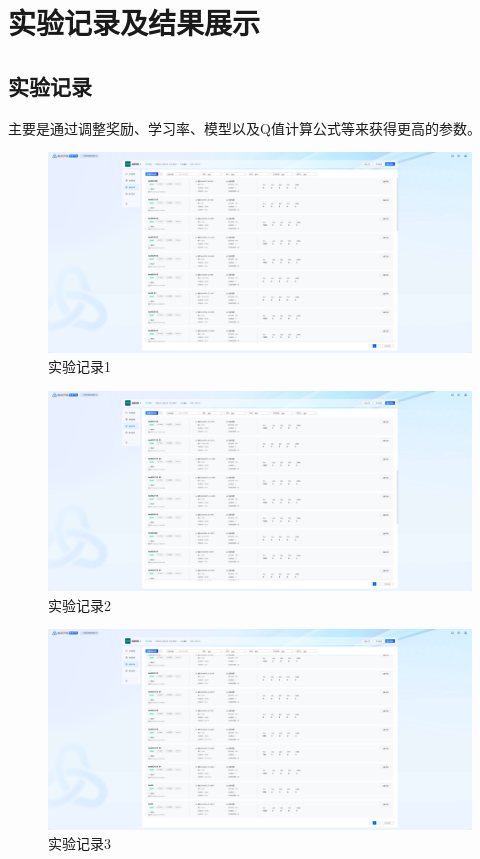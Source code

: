 \section{实验记录及结果展示}

\subsection{实验记录}
主要是通过调整奖励、学习率、模型以及Q值计算公式等来获得更高的参数。
\begin{figure}[H]
    \centering
    \includegraphics[width=0.8\linewidth]{pic/record-1.png}
    \caption{ 实验记录1}
    \label{map}
\end{figure}

\begin{figure}[H]
    \centering
    \includegraphics[width=0.8\linewidth]{pic/record-2.png}
    \caption{ 实验记录2}
    \label{map}
\end{figure}

\begin{figure}[H]
    \centering
    \includegraphics[width=0.8\linewidth]{pic/record-3.png}
    \caption{ 实验记录3}
    \label{map}
\end{figure}



